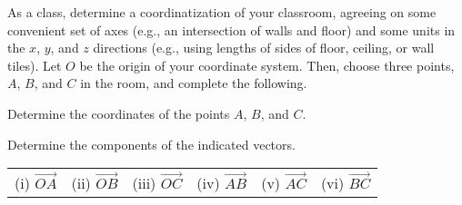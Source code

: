 \begin{activity} \label{A:9.2.1}  As a class, determine a coordinatization of your classroom, agreeing on some convenient set of axes (e.g., an intersection of walls and floor) and some units in the $x$, $y$, and $z$ directions (e.g., using lengths of sides of floor, ceiling, or wall tiles). Let $O$ be the origin of your coordinate system. Then, choose three points, $A$, $B$, and $C$ in the room, and complete the following.
\ba
	\item Determine the coordinates of the points $A$, $B$, and $C$.

    \item Determine the components of the indicated vectors.
    \begin{center}
	\begin{tabular}{cccccc}
(i) $\overrightarrow{OA}$ &(ii) $\overrightarrow{OB}$ &(iii) $\overrightarrow{OC}$ &(iv) $\overrightarrow{AB}$ &(v) $\overrightarrow{AC}$ &(vi) $\overrightarrow{BC}$
	\end{tabular}
    \end{center}

    \ea
\end{activity}
\begin{smallhint}

\end{smallhint}
\begin{bighint}

\end{bighint}
\begin{activitySolution}

\end{activitySolution}
\aftera
